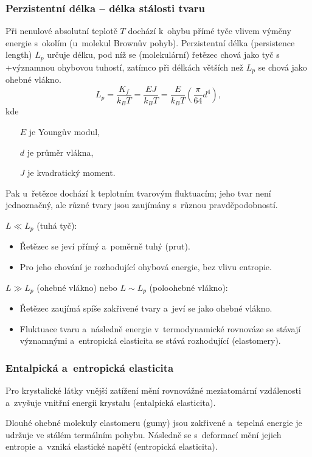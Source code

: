 \subsubsection{Perzistentní délka -- délka stálosti tvaru}
Při nenulové absolutní teplotě $T$ dochází k~ohybu přímé tyče vlivem výměny energie s~okolím (u~molekul Brownův pohyb).
Perzistentní délka (persistence length) $L_p$ určuje délku, pod níž se (molekulární) řetězec chová jako tyč s +významnou ohybovou tuhostí, zatímco při délkách větších než $L_p$ se chová jako ohebné vlákno.
\begin{equation}
	L_p = \frac{K_f}{k_B T} = \frac{E J}{k_B T} = \frac{E}{k_B T} \left(\frac{\pi}{64} d^4\right),
\end{equation}
kde
\begin{itemize}
	\item[$E$] je Youngův modul,
	\item[$d$] je průměr vlákna,
	\item[$J$] je kvadratický moment.
\end{itemize}
Pak u~řetězce dochází k teplotním tvarovým fluktuacím; jeho tvar není jednoznačný, ale různé tvary jsou zaujímány s~různou pravděpodobností.

$L \ll L_p$ (tuhá tyč):
\begin{itemize}
	\item Řetězec se jeví přímý a~poměrně tuhý (prut).
	\item Pro jeho chování je rozhodující ohybová energie, bez vlivu entropie.
\end{itemize}

$L \gg L_p$ (ohebné vlákno) nebo $L \sim L_p$ (poloohebné vlákno):
\begin{itemize}
	\item Řetězec zaujímá spíše zakřivené tvary a~jeví se jako ohebné vlákno.
	\item Fluktuace tvaru a~následně energie v~termodynamické rovnováze se stávají významnými a~entropická elasticita se stává rozhodující (elastomery).
\end{itemize}

\subsubsection{Entalpická a~entropická elasticita}
Pro krystalické látky vnější zatížení mění rovnovážné meziatomární vzdálenosti a~zvyšuje vnitřní energii krystalu (entalpická elasticita).

Dlouhé ohebné molekuly elastomeru (gumy) jsou zakřivené a~tepelná energie je udržuje ve stálém termálním pohybu. Následně se s~deformací mění jejich entropie a~vzniká elastické napětí (entropická elasticita).

